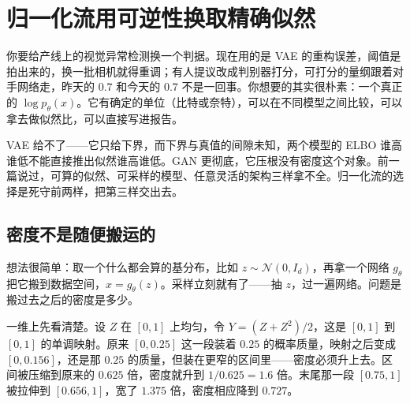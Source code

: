 \section{归一化流用可逆性换取精确似然}
\label{sec:14-Deep-Learning/07-Generative-Models-Unified/02}

你要给产线上的视觉异常检测换一个判据。现在用的是 VAE 的重构误差，阈值是拍出来的，换一批相机就得重调；有人提议改成判别器打分，可打分的量纲跟着对手网络走，昨天的 \(0.7\) 和今天的 \(0.7\) 不是一回事。你想要的其实很朴素：一个真正的 \(\log p_\theta(x)\)。它有确定的单位（比特或奈特），可以在不同模型之间比较，可以拿去做似然比，可以直接写进报告。

VAE 给不了——它只给下界，而下界与真值的间隙未知，两个模型的 ELBO 谁高谁低不能直接推出似然谁高谁低。GAN 更彻底，它压根没有密度这个对象。前一篇说过，可算的似然、可采样的模型、任意灵活的架构三样拿不全。归一化流的选择是死守前两样，把第三样交出去。

\subsection{密度不是随便搬运的}

想法很简单：取一个什么都会算的基分布，比如 \(z\sim\mathcal N(0,I_d)\)，再拿一个网络 \(g_\theta\) 把它搬到数据空间，\(x=g_\theta(z)\)。采样立刻就有了——抽 \(z\)，过一遍网络。问题是搬过去之后的密度是多少。

一维上先看清楚。设 \(Z\) 在 \([0,1]\) 上均匀，令 \(Y=(Z+Z^2)/2\)，这是 \([0,1]\) 到 \([0,1]\) 的单调映射。原来 \([0,0.25]\) 这一段装着 \(0.25\) 的概率质量，映射之后变成 \([0,0.156]\)，还是那 \(0.25\) 的质量，但装在更窄的区间里——密度必须升上去。区间被压缩到原来的 \(0.625\) 倍，密度就升到 \(1/0.625=1.6\) 倍。末尾那一段 \([0.75,1]\) 被拉伸到 \([0.656,1]\)，宽了 \(1.375\) 倍，密度相应降到 \(0.727\)。

